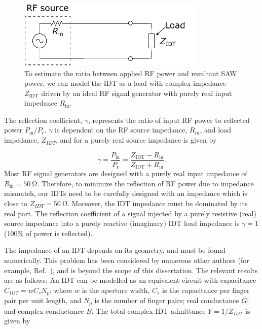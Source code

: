 \documentclass{beavtex_dub_edit}
\begin{document}
\begin{figure}
    \includegraphics[width = 0.8\textwidth]{IDT signal line model.pdf}
    \caption{To estimate the ratio between applied RF power and resultant SAW power, we can model the IDT as a load with complex impedance $Z_{\mathrm{IDT}}$ driven by an ideal RF signal generator with purely real input impedance $R_{\mathrm{in}}$.}
    \label{transmission line}
\end{figure}
The reflection coefficient, $\gamma$, represents the ratio of input RF power to reflected power $P_{\mathrm{in}}/P_{\mathrm{r}}$. $\gamma$ is dependent on the RF source impedance, $R_{in}$, and load impedance, $Z_{IDT}$, and for a purely real source impedance is given by \cite{kurokawa_power_1965}

\begin{equation}
    \gamma = \frac{P_{\mathrm{in}}}{P_{\mathrm{r}}} = \frac{Z_{\mathrm{IDT}} - R_{\mathrm{in}}}{Z_{\mathrm{IDT}} + R_{\mathrm{in}}}.
    \label{reflection coefficient}
\end{equation}
Most RF signal generators are designed with a purely real input impedance of $R_{\mathrm{in}} = \SI{50}{\ohm}$. Therefore, to minimize the reflection of RF power due to impedance mismatch, our IDTs need to be carefully designed with an impedance which is close to $Z_{IDT} = \SI{50}{\ohm}$. Moreover, the IDT impedance must be dominated by its real part. The reflection coefficient of a signal injected by a purely resistive (real) source impedance into a purely reactive (imaginary) IDT load impedance is $\gamma = 1$ (100\% of power is reflected).

The impedance of an IDT depends on its geometry, and must be found numerically. This problem has been considered by numerous other authors (for example, Ref.\ \cite{smith_analysis_1969}), and is beyond the scope of this dissertation. The relevant results are as follows: An IDT can be modelled as an equivalent circuit with capacitance $C_{IDT} = w C_s N_p$; where $w$ is the aperture width, $C_s$ is the capacitance per finger pair per unit length, and $N_p$ is the number of finger pairs; real conductance $G$; and complex conductance $B$. The total complex IDT admittance $Y = 1/Z_{IDT}$ is given by 
\end{document}
